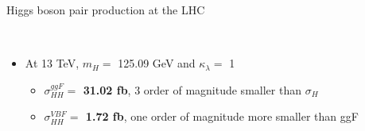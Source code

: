 \begin{frame}{Higgs boson pair production at the LHC}
\begin{figure}
     \\
\end{figure}

\begin{itemize}
    \item At 13 TeV, $m_{H} = $ 125.09 GeV and $\kappa_{\lambda} = $ 1 
    \begin{itemize}
        \item \textcolor{HHred}{\textbf{$\sigma^{ggF}_{HH} = $ 31.02 fb}}, 3 order of magnitude smaller than $\sigma_{H}$
        \item \textcolor{HHturquoise_d}{\textbf{$\sigma^{VBF}_{HH} = $ 1.72 fb}}, one order of magnitude more smaller than ggF
    \end{itemize}
\end{itemize}

\end{frame}


